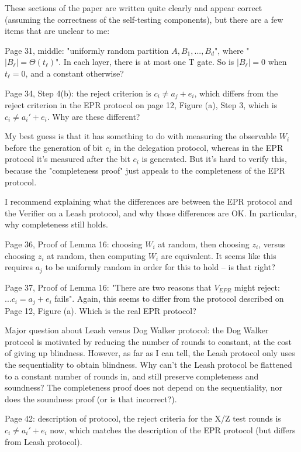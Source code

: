\documentclass[12pt]{article}
\begin{document}
These sections of the paper are written quite clearly and appear correct (assuming the correctness of the self-testing components), but there are a few items that are unclear to me:

Page 31, middle: "uniformly random partition $A, B_1,..., B_d$", where "$|B_\ell| = \Theta(t_\ell)$". In each layer, there is at most one T gate. So is $|B_\ell| = 0$ when $t_\ell = 0$, and a constant otherwise?

Page 34, Step 4(b): the reject criterion is $c_i \neq a_j + e_i$, which differs from the reject criterion in the EPR protocol on page 12, Figure (a), Step 3, which is $c_i \neq a_i' + e_i$. Why are these different?

My best guess is that it has something to do with measuring the observable $W_i$ before the generation of bit $c_i$ in the delegation protocol, whereas in the EPR protocol it's measured after the bit $c_i$ is generated. But it's hard to verify this, because the "completeness proof" just appeals to the completeness of the EPR protocol.

I recommend explaining what the differences are between the EPR protocol and the Verifier on a Leash protocol, and why those differences are OK. In particular, why completeness still holds.

Page 36, Proof of Lemma 16: choosing $W_i$ at random, then choosing $z_i$, versus choosing $z_i$ at random, then computing $W_i$ are equivalent. It seems like this requires $a_j$ to be uniformly random in order for this to hold -- is that right?

Page 37, Proof of Lemma 16: "There are two reasons that $V_{EPR}$ might reject: $... c_i = a_j + e_i$ fails". Again, this seems to differ from the protocol described on Page 12, Figure (a). Which is the real EPR protocol?

Major question about Leash versus Dog Walker protocol: the Dog Walker protocol is motivated by reducing the number of rounds to constant, at the cost of giving up blindness. However, as far as I can tell, the Leash protocol only uses the sequentiality to obtain blindness. Why can't the Leash protocol be flattened to a constant number of rounds in, and still preserve completeness and soundness? The completeness proof does not depend on the sequentiality, nor does the soundness proof (or is that incorrect?).

Page 42: description of protocol, the reject criteria for the X/Z test rounds is $c_i \neq a_i' + e_i$ now, which matches the description of the EPR protocol (but differs from Leash protocol).
\end{document}
